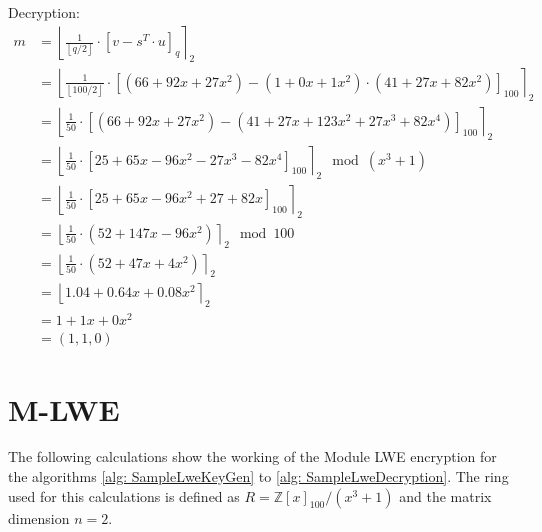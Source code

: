 Decryption:
\begin{align*}
  m & = \left\lfloor \frac{1}{\left\lfloor q/2\right\rfloor}\cdot\left[v-s^T \cdot u\right]_q \right\rceil _2                                                  \\
    & = \left\lfloor \frac{1}{\left\lfloor 100/2\right\rfloor}\cdot\left[(66 + 92x + 27x^2 )- (1 + 0x + 1x^2) \cdot (41+27x+82x^2)\right]_{100}\right\rceil _2 \\
    & = \left\lfloor \frac{1}{50}\cdot\left[(66 + 92x + 27x^2 )- (41 + 27x + 123x^2 + 27x^3 + 82x^4)\right]_{100}\right\rceil _2                               \\
    & = \left\lfloor \frac{1}{50}\cdot\left[25 + 65x - 96x^2 - 27x^3 - 82x^4\right]_{100}\right\rceil _2 \mod (x^3+1)                                          \\
    & = \left\lfloor \frac{1}{50}\cdot\left[25 + 65x - 96x^2 + 27 + 82x\right]_{100}\right\rceil _2                                                            \\
    & = \left\lfloor \frac{1}{50}\cdot(52+147x-96x^2)\right\rceil _2 \mod 100                                                                                  \\
    & = \left\lfloor \frac{1}{50}\cdot(52+47x+4x^2)\right\rceil _2                                                                                             \\
    & = \left\lfloor 1.04 + 0.64x + 0.08x^2\right\rceil _2                                                                                                     \\
    & = 1 + 1x + 0x^2                                                                                                                                          \\
    & = (1, 1, 0)
\end{align*}

\section{M-LWE}
\label{app:MlweExampleCalc}
The following calculations show the working of the Module LWE encryption for the algorithms \ref{alg: SampleLweKeyGen} to \ref{alg: SampleLweDecryption}. The ring used for this calculations is defined as $R=\mathbb{Z}[x]_{100}/(x^3+1)$ and the matrix dimension $n=2$.

